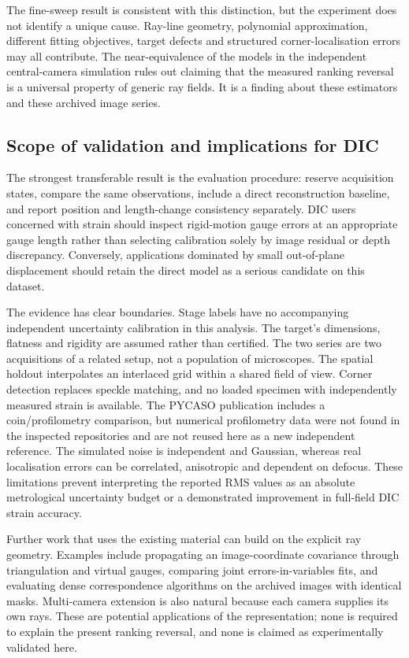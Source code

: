 \documentclass[10pt,a4paper]{article}
\begin{document}
The fine-sweep result is consistent with this distinction, but the experiment does not identify a unique cause. Ray-line geometry, polynomial approximation, different fitting objectives, target defects and structured corner-localisation errors may all contribute. The near-equivalence of the models in the independent central-camera simulation rules out claiming that the measured ranking reversal is a universal property of generic ray fields. It is a finding about these estimators and these archived image series.

\subsection{Scope of validation and implications for DIC}
The strongest transferable result is the evaluation procedure: reserve acquisition states, compare the same observations, include a direct reconstruction baseline, and report position and length-change consistency separately. DIC users concerned with strain should inspect rigid-motion gauge errors at an appropriate gauge length rather than selecting calibration solely by image residual or depth discrepancy. Conversely, applications dominated by small out-of-plane displacement should retain the direct model as a serious candidate on this dataset.

The evidence has clear boundaries. Stage labels have no accompanying independent uncertainty calibration in this analysis. The target's dimensions, flatness and rigidity are assumed rather than certified. The two series are two acquisitions of a related setup, not a population of microscopes. The spatial holdout interpolates an interlaced grid within a shared field of view. Corner detection replaces speckle matching, and no loaded specimen with independently measured strain is available. The PYCASO publication includes a coin/profilometry comparison, but numerical profilometry data were not found in the inspected repositories and are not reused here as a new independent reference. The simulated noise is independent and Gaussian, whereas real localisation errors can be correlated, anisotropic and dependent on defocus. These limitations prevent interpreting the reported RMS values as an absolute metrological uncertainty budget or a demonstrated improvement in full-field DIC strain accuracy.

Further work that uses the existing material can build on the explicit ray geometry. Examples include propagating an image-coordinate covariance through triangulation and virtual gauges, comparing joint errors-in-variables fits, and evaluating dense correspondence algorithms on the archived images with identical masks. Multi-camera extension is also natural because each camera supplies its own rays. These are potential applications of the representation; none is required to explain the present ranking reversal, and none is claimed as experimentally validated here.
\end{document}
